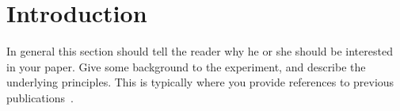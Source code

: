 \section{Introduction}

In general this section should tell the reader why he or she should
be interested in your paper. Give some background to the
experiment, and describe the underlying principles. This is typically where you provide references to previous publications~\cite{Sato2003,Cross2004}.